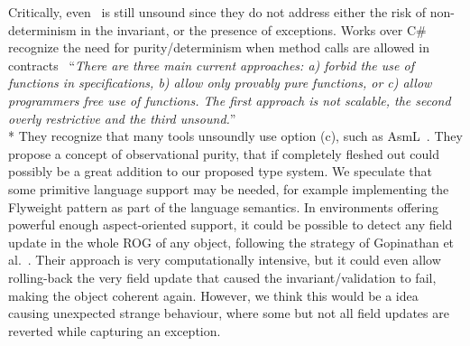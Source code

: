 Critically, even~\cite{Gopinathan:2008:RMO:1483018.1483028} is still unsound since they do not address either
the risk of non-determinism in the invariant, 
or the presence of exceptions.
\sepItems
Works over C\# recognize the need
for purity/determinism when method calls are allowed in contracts~\cite{barnett200499}
``\emph{There are three main current approaches: a) forbid the use of functions in specifications, b) allow only provably pure functions, or c) allow programmers free use
of functions. The first approach is not scalable, the second overly restrictive and
the third unsound.}''\\*
They recognize that many tools unsoundly use option (c), such as AsmL~\cite{barnett2003runtime}.
They propose a concept of observational purity, that if completely fleshed out
could possibly be a great addition to our proposed type system.
We speculate that some 
primitive language support may be needed, for example implementing the Flyweight pattern 
as part of the language semantics.
\sepItems
In environments offering powerful enough aspect-oriented support,
it could be possible to detect any field update in the whole ROG of
any object, following the strategy of 
Gopinathan et al.~\cite{Gopinathan:2008:RMO:1483018.1483028}.
Their approach is very computationally intensive, but it could even allow rolling-back the very field update that caused 
the invariant/validation to fail, making the object coherent again.
However, we think this would be a  idea causing unexpected strange behaviour, where some but not all
field updates are reverted while capturing an exception.



